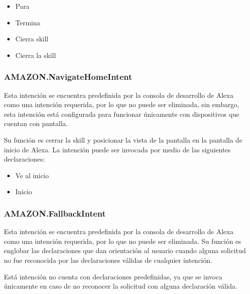 \begin{itemize}
  \item Para
  \item Termina
  \item Cierra skill
  \item Cierra la skill
\end{itemize}


\subsubsection{AMAZON.NavigateHomeIntent}
\label{NavigateHomeIntentcapIV}

Esta intención se encuentra predefinida por la consola de desarrollo de Alexa como una intención requerida, por lo que no puede ser eliminada, sin embargo, esta intención está configurada para funcionar únicamente con dispositivos que cuentan con pantalla.

Su función es cerrar la skill y posicionar la vista de la pantalla en la pantalla de inicio de Alexa. La intención puede ser invocada por medio de las siguientes declaraciones:

\begin{itemize}
  \item Ve al inicio
  \item Inicio
\end{itemize}


\subsubsection{AMAZON.FallbackIntent}
\label{FallbackIntentcapIV}

Esta intención se encuentra predefinida por la consola de desarrollo de Alexa como una intención requerida, por lo que no puede ser eliminada. Su función es englobar las declaraciones que dan orientación al usuario cuando alguna solicitud no fue reconocida por las declaraciones válidas de cualquier intención.

Está intención no cuenta con declaraciones predefinidas, ya que se invoca únicamente en caso de no reconocer la solicitud con alguna declaración válida.

